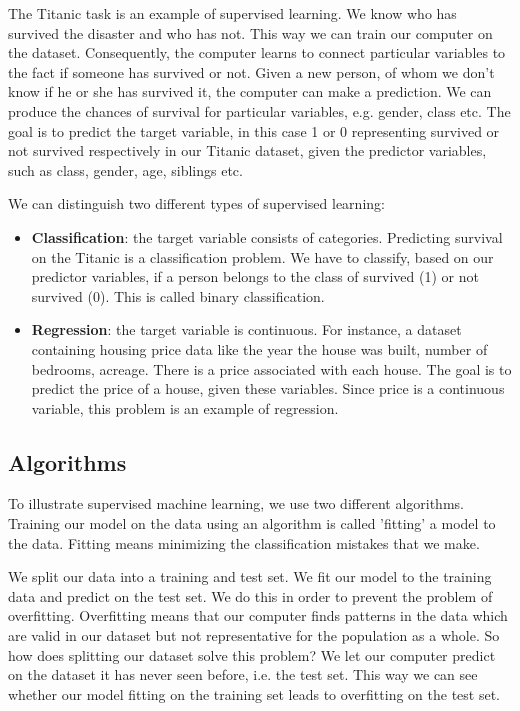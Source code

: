 \documentclass[11pt]{article}
\begin{document}
The Titanic task is an example of supervised learning. We know who has survived the disaster and who has not. This way we can train our computer on the dataset. Consequently, the computer learns to connect particular variables to the fact if someone has survived or not. Given a new person, of whom we don't know if he or she has survived it, the computer can make a prediction. We can produce the chances of survival for particular variables, e.g. gender, class etc. The goal is to predict the target variable, in this case 1 or 0 representing survived or not survived respectively in our Titanic dataset, given the predictor variables, such as class, gender, age, siblings etc. 

We can distinguish two different types of supervised learning: 
\begin{itemize}
\item \textbf{Classification}: the target variable consists of categories. Predicting survival on the Titanic is a classification problem. We have to classify, based on our predictor variables, if a person belongs to the class of survived (1) or not survived (0). This is called binary classification.
\item \textbf{Regression}: the target variable is continuous. For instance, a dataset containing housing price data like the year the house was built, number of bedrooms, acreage. There is a price associated with each house. The goal is to predict the price of a house, given these variables. Since price is a continuous variable, this problem is an example of regression.
\end{itemize}


\subsection{Algorithms}
\label{sec:org85cd803}
To illustrate supervised machine learning, we use two different algorithms. Training our model on the data using an algorithm is called 'fitting' a model to the data. Fitting means minimizing the classification mistakes that we make. 

We split our data into a training and test set. We fit our model to the training data and predict on the test set. We do this in order to prevent the problem of overfitting. Overfitting means that our computer finds patterns in the data which are valid in our dataset but not representative for the population as a whole. So how does splitting our dataset solve this problem? We let our computer predict on the dataset it has never seen before, i.e. the test set. This way we can see whether our model fitting on the training set leads to overfitting on the test set. 
\end{document}
